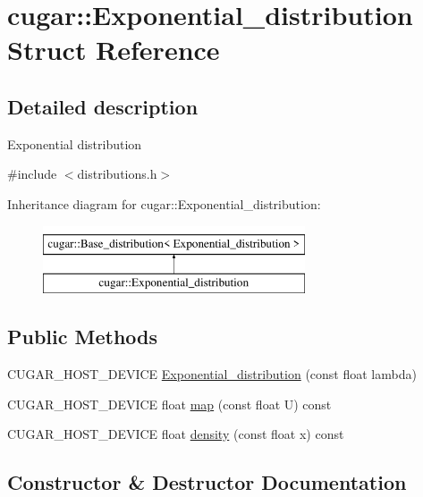 \hypertarget{structcugar_1_1_exponential__distribution}{}\section{cugar\+:\+:Exponential\+\_\+distribution Struct Reference}
\label{structcugar_1_1_exponential__distribution}


\subsection{Detailed description}
Exponential distribution 

{\ttfamily \#include $<$distributions.\+h$>$}

Inheritance diagram for cugar\+:\+:Exponential\+\_\+distribution\+:\begin{figure}[H]
\begin{center}
\leavevmode
\includegraphics[height=2.000000cm]{structcugar_1_1_exponential__distribution}
\end{center}
\end{figure}
\subsection*{Public Methods}
\begin{DoxyCompactItemize}
\item 
C\+U\+G\+A\+R\+\_\+\+H\+O\+S\+T\+\_\+\+D\+E\+V\+I\+CE \hyperlink{structcugar_1_1_exponential__distribution_aea929c1395b07a67ecbaa15a9c51f8e7}{Exponential\+\_\+distribution} (const float lambda)
\item 
C\+U\+G\+A\+R\+\_\+\+H\+O\+S\+T\+\_\+\+D\+E\+V\+I\+CE float \hyperlink{structcugar_1_1_exponential__distribution_a3af4566629aa9d4d4488b3795a53c4ee}{map} (const float U) const
\item 
C\+U\+G\+A\+R\+\_\+\+H\+O\+S\+T\+\_\+\+D\+E\+V\+I\+CE float \hyperlink{structcugar_1_1_exponential__distribution_a23a3999512db509214ac2e6a0ee2c4ef}{density} (const float x) const
\end{DoxyCompactItemize}


\subsection{Constructor \& Destructor Documentation}
\mbox{\label{structcugar_1_1_exponential__distribution_aea929c1395b07a67ecbaa15a9c51f8e7}} 
